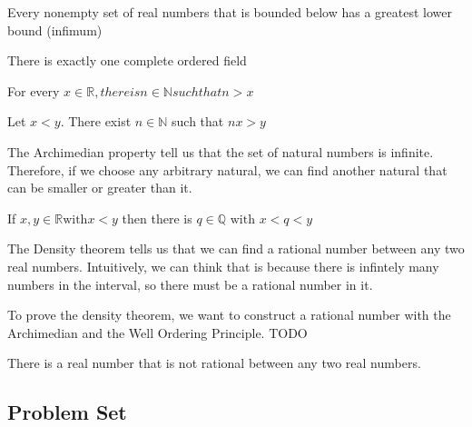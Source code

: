 \documentclass{article}
\begin{document}
\begin{corollary}
    Every nonempty set of real numbers that is bounded below has a greatest
    lower bound (infimum)
\end{corollary}

\begin{theorem}
    There is exactly one complete ordered field
\end{theorem}

\begin{theorem}
    For every $x \in \mathbb{R}, there is n \in \mathbb{N} such that n > x $
\end{theorem}

\begin{corollary}
    Let $x<y$. There exist $n \in \mathbb{N}$ such that $nx>y$
\end{corollary}

\begin{remark}
    The Archimedian property tell us that the set of natural numbers is infinite.
    Therefore, if we choose any arbitrary natural, we can find another natural
    that can be smaller or greater than it.
\end{remark}

\begin{theorem}
    If $x, y \in \mathbb{R} \text{with} x<y$ then there is $q \in \mathbb{Q}
    \text{ with } x<q<y $
\end{theorem}

\begin{remark}
    The Density theorem tells us that we can find a rational number between any
    two real numbers. Intuitively, we can think that is because there is infintely
    many numbers in the interval, so there must be a rational number in it.
\end{remark}

\begin{remark}
    To prove the density theorem, we want to construct a rational number with
    the Archimedian and the Well Ordering Principle. TODO
\end{remark}

\begin{corollary}
    There is a real number that is not rational between any two real numbers.
\end{corollary}

\subsection{Problem Set}
\end{document}
